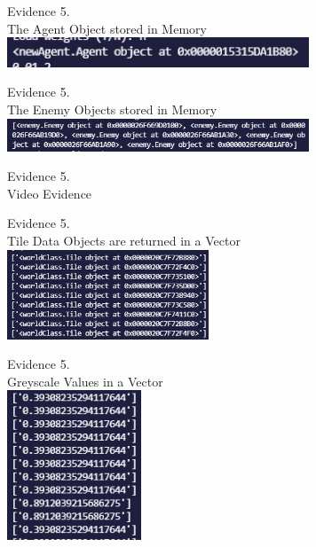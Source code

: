 \setcounter{magicrownumbers}{0}
\begin{center}
    {\large Evidence 5.\rn } \\ 
    \vspace{0.3cm}
    The Agent Object stored in Memory \\
    \includegraphics[width=9cm]{Images/Testing/T5.1.1.PNG} \\
    \vspace{1cm}

    {\large Evidence 5.\rn } \\ 
    \vspace{0.3cm}
    The Enemy Objects stored in Memory \\
    \includegraphics[width=9cm]{Images/Testing/T5.2.1.PNG} \\
    \vspace{1cm}

    {\large Evidence 5.\rn } \\ 
    \vspace{0.3cm}
    Video Evidence
    \vspace{1cm}

    {\large Evidence 5.\rn } \\ 
    \vspace{0.3cm}
    Tile Data Objects are returned in a Vector \\
    \includegraphics[width=6cm]{Images/Testing/T5.4.1.PNG} \\
    \vspace{1cm}

    {\large Evidence 5.\rn } \\ 
    \vspace{0.3cm}
    Greyscale Values in a Vector \\
    \includegraphics[width=4cm]{Images/Testing/T5.5.1.PNG} \\
    \vspace{1cm}


\end{center}
